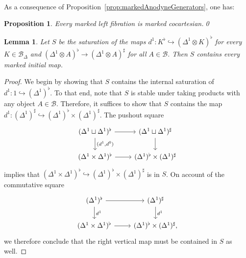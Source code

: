 \documentclass[reqno]{amsart}
\numberwithin{equation}{subsection}
\theoremstyle{plain}
\newtheorem{proposition}[equation]{Proposition}
\newtheorem{lemma}[equation]{Lemma}
\theoremstyle{definition}
\let\scr=\mathcal
\let\into=\hookrightarrow
\def\BB{\scr B}
\newcommand{\Simp}[1]{#1_{\Delta}}
\begin{document}
As a consequence of Proposition~\ref{prop:markedAnodyneGenerators}, one has:
\begin{proposition}
	\label{prop:markedLeftCocartesian}
	Every marked left fibration is marked cocartesian.\qed
\end{proposition}

\begin{lemma}
	\label{lem:generatorsMarkedInitial}
	Let $S$ be the saturation of the maps $d^1\colon K^\flat\into (\Delta^1\otimes K)^\flat$ for every $K\in\Simp\BB$ and $(\Delta^1\otimes A)^\flat\to(
	\Delta^1\otimes A)^\sharp$ for all $A\in\BB$. Then $S$ contains every marked initial map.
\end{lemma}
\begin{proof}
	We begin by showing that $S$ contains the internal saturation of $d^1\colon 1\into(\Delta^1)^\flat$. To that end, note that $S$ is stable under taking products with any object $A\in\BB$. Therefore, it suffices to show that $S$ contains the map $d^1\colon (\Delta^1)^\sharp\into (\Delta^1)^\flat\times(\Delta^1)^\sharp$. The pushout square
	\begin{equation*}
		\begin{tikzcd}
		(\Delta^1\sqcup\Delta^1)^\flat\arrow[r]\arrow[d, "{(d^1,d^0)}"] & (\Delta^1\sqcup\Delta^1)^\sharp\arrow[d]\\
		(\Delta^1\times\Delta^1)^\flat\arrow[r] & (\Delta^1)^\flat\times(\Delta^1)^\sharp
		\end{tikzcd}
	\end{equation*}
	implies that $(\Delta^1\times\Delta^1)^\flat\into(\Delta^1)^\flat\times(\Delta^1)^\sharp$ is in $S$. On account of the commutative square
	\begin{equation*}
		\begin{tikzcd}
		(\Delta^1)^\flat\arrow[r]\arrow[d, "d^1"] & (\Delta^1)^\sharp\arrow[d, "d^1"] \\
		(\Delta^1\times\Delta^1)^\flat\arrow[r] & (\Delta^1)^\flat\times(\Delta^1)^\sharp,
		\end{tikzcd}
	\end{equation*}
	we therefore conclude that the right vertical map must be contained in $S$ as well. 


\end{proof}
\end{document}
